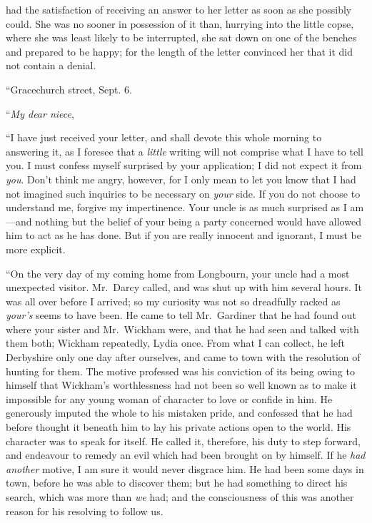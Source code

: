  had the satisfaction of receiving an answer to her
letter as soon as she possibly could.  She was no sooner in
possession of it than, hurrying into the little copse, where
she was least likely to be interrupted, she sat down on one of
the benches and prepared to be happy; for the length of the
letter convinced her that it did not contain a denial.

\bigskip
``Gracechurch street, Sept. 6.
\medskip

``\emph{My dear niece},
\medskip

``I have just received your letter, and shall devote this whole
morning to answering it, as I foresee that a \emph{little} writing
will not comprise what I have to tell you.  I must confess
myself surprised by your application; I did not expect it from
\emph{you}.  Don't think me angry, however, for I only mean to let
you know that I had not imagined such inquiries to be necessary
on \emph{your} side.  If you do not choose to understand me, forgive
my impertinence.  Your uncle is as much surprised as I am---and
nothing but the belief of your being a party concerned would
have allowed him to act as he has done.  But if you are really
innocent and ignorant, I must be more explicit.

``On the very day of my coming home from Longbourn, your uncle had a
most unexpected visitor.  Mr.\ Darcy called, and was shut up with him
several hours.  It was all over before I arrived; so my curiosity was
not so dreadfully racked as \emph{your's} seems to have been.  He came to
tell Mr.\ Gardiner that he had found out where your sister and
Mr.\ Wickham were, and that he had seen and talked with them both;
Wickham repeatedly, Lydia once.  From what I can collect, he left
Derbyshire only one day after ourselves, and came to town with the
resolution of hunting for them.  The motive professed was his
conviction of its being owing to himself that Wickham's worthlessness
had not been so well known as to make it impossible for any young
woman of character to love or confide in him.  He generously imputed
the whole to his mistaken pride, and confessed that he had before
thought it beneath him to lay his private actions open to the world.
His character was to speak for itself.  He called it, therefore, his
duty to step forward, and endeavour to remedy an evil which had been
brought on by himself.  If he \emph{had another} motive, I am sure it would
never disgrace him.  He had been some days in town, before he was able
to discover them; but he had something to direct his search, which was
more than \emph{we} had; and the consciousness of this was another reason for
his resolving to follow us.

